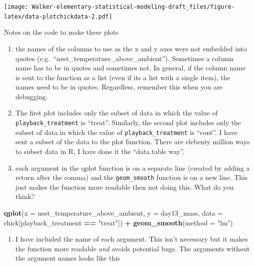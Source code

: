 \documentclass[]{book}
\newenvironment{Shaded}{\begin{snugshade}}{\end{snugshade}}
\newcommand{\DataTypeTok}[1]{\textcolor[rgb]{0.13,0.29,0.53}{#1}}
\newcommand{\KeywordTok}[1]{\textcolor[rgb]{0.13,0.29,0.53}{\textbf{#1}}}
\newcommand{\NormalTok}[1]{#1}
\newcommand{\OperatorTok}[1]{\textcolor[rgb]{0.81,0.36,0.00}{\textbf{#1}}}
\newcommand{\StringTok}[1]{\textcolor[rgb]{0.31,0.60,0.02}{#1}}
\providecommand{\tightlist}{%
  \setlength{\itemsep}{0pt}\setlength{\parskip}{0pt}}
\begin{document}
\texttt{[image: Walker-elementary-statistical-modeling-draft\_files/figure-latex/data-plotchickdata-2.pdf]}

Notes on the code to make these plots

\begin{enumerate}
\def\labelenumi{\arabic{enumi}.}
\tightlist
\item
  the names of the columns to use as the x and y axes were not embedded into quotes (e.g.~``nest\_temperature\_above\_ambient''). Sometimes a column name has to be in quotes and sometimes not. In general, if the column name is sent to the function as a list (even if its a list with a single item), the names need to be in quotes. Regardless, remember this when you are debugging.
\item
  The first plot includes only the subset of data in which the value of \texttt{playback\_treatment} is ``treat''. Similarly, the second plot includes only the subset of data in which the value of \texttt{playback\_treatment} is ``cont''. I have sent a subset of the data to the plot function. There are elebenty million ways to subset data in R, I have done it the ``data.table way''.
\item
  each argument in the qplot function is on a separate line (created by adding a return after the comma) and the \texttt{geom\_smooth} function is on a new line. This just makes the function more readable then not doing this. What do you think?
\end{enumerate}

\begin{Shaded}
\begin{Highlighting}[]
\KeywordTok{qplot}\NormalTok{(}\DataTypeTok{x =}\NormalTok{ nest_temperature_above_ambient, }\DataTypeTok{y =}\NormalTok{ day13_mass, }\DataTypeTok{data =}\NormalTok{ chick[playback_treatment }\OperatorTok{==}\StringTok{ "treat"}\NormalTok{]) }\OperatorTok{+}\StringTok{ }\KeywordTok{geom_smooth}\NormalTok{(}\DataTypeTok{method =} \StringTok{"lm"}\NormalTok{)}
\end{Highlighting}
\end{Shaded}

\begin{enumerate}
\def\labelenumi{\arabic{enumi}.}
\setcounter{enumi}{3}
\tightlist
\item
  I have included the name of each argument. This isn't necessary but it makes the function more readable \emph{and} avoids potential bugs. The arguments without the argument names looks like this
\end{enumerate}
\end{document}

